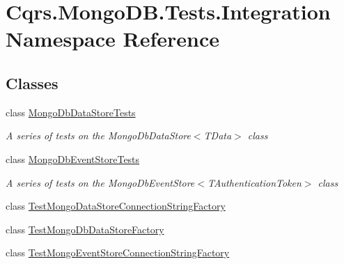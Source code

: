 \hypertarget{namespaceCqrs_1_1MongoDB_1_1Tests_1_1Integration}{}\section{Cqrs.\+Mongo\+D\+B.\+Tests.\+Integration Namespace Reference}
\label{namespaceCqrs_1_1MongoDB_1_1Tests_1_1Integration}
\subsection*{Classes}
\begin{DoxyCompactItemize}
\item 
class \hyperlink{classCqrs_1_1MongoDB_1_1Tests_1_1Integration_1_1MongoDbDataStoreTests}{Mongo\+Db\+Data\+Store\+Tests}
\begin{DoxyCompactList}\small\item\em A series of tests on the Mongo\+Db\+Data\+Store$<$\+T\+Data$>$ class \end{DoxyCompactList}\item 
class \hyperlink{classCqrs_1_1MongoDB_1_1Tests_1_1Integration_1_1MongoDbEventStoreTests}{Mongo\+Db\+Event\+Store\+Tests}
\begin{DoxyCompactList}\small\item\em A series of tests on the Mongo\+Db\+Event\+Store$<$\+T\+Authentication\+Token$>$ class \end{DoxyCompactList}\item 
class \hyperlink{classCqrs_1_1MongoDB_1_1Tests_1_1Integration_1_1TestMongoDataStoreConnectionStringFactory}{Test\+Mongo\+Data\+Store\+Connection\+String\+Factory}
\item 
class \hyperlink{classCqrs_1_1MongoDB_1_1Tests_1_1Integration_1_1TestMongoDbDataStoreFactory}{Test\+Mongo\+Db\+Data\+Store\+Factory}
\item 
class \hyperlink{classCqrs_1_1MongoDB_1_1Tests_1_1Integration_1_1TestMongoEventStoreConnectionStringFactory}{Test\+Mongo\+Event\+Store\+Connection\+String\+Factory}
\end{DoxyCompactItemize}
